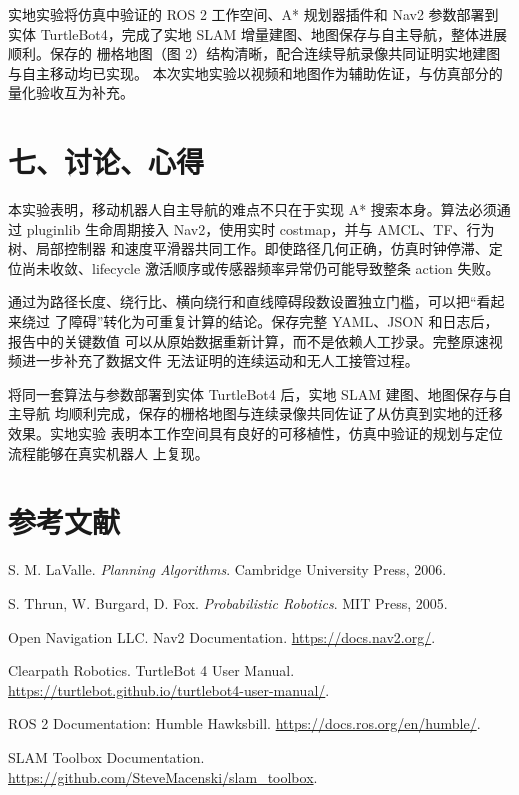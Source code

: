 \documentclass[12pt,a4paper]{ctexart}
\begin{document}
实地实验将仿真中验证的 ROS 2 工作空间、A* 规划器插件和 Nav2 参数部署到实体
TurtleBot4，完成了实地 SLAM 增量建图、地图保存与自主导航，整体进展顺利。保存的
栅格地图（图 2）结构清晰，配合连续导航录像共同证明实地建图与自主移动均已实现。
本次实地实验以视频和地图作为辅助佐证，与仿真部分的量化验收互为补充。

\section*{七、讨论、心得}

本实验表明，移动机器人自主导航的难点不只在于实现 A* 搜索本身。算法必须通过
pluginlib 生命周期接入 Nav2，使用实时 costmap，并与 AMCL、TF、行为树、局部控制器
和速度平滑器共同工作。即使路径几何正确，仿真时钟停滞、定位尚未收敛、lifecycle
激活顺序或传感器频率异常仍可能导致整条 action 失败。

通过为路径长度、绕行比、横向绕行和直线障碍段数设置独立门槛，可以把“看起来绕过
了障碍”转化为可重复计算的结论。保存完整 YAML、JSON 和日志后，报告中的关键数值
可以从原始数据重新计算，而不是依赖人工抄录。完整原速视频进一步补充了数据文件
无法证明的连续运动和无人工接管过程。

将同一套算法与参数部署到实体 TurtleBot4 后，实地 SLAM 建图、地图保存与自主导航
均顺利完成，保存的栅格地图与连续录像共同佐证了从仿真到实地的迁移效果。实地实验
表明本工作空间具有良好的可移植性，仿真中验证的规划与定位流程能够在真实机器人
上复现。

\section*{参考文献}

\begin{enumerate}[label={[\arabic*]}]
  \item S. M. LaValle. \emph{Planning Algorithms}. Cambridge University Press, 2006.
  \item S. Thrun, W. Burgard, D. Fox. \emph{Probabilistic Robotics}. MIT Press, 2005.
  \item Open Navigation LLC. Nav2 Documentation.
  \url{https://docs.nav2.org/}.
  \item Clearpath Robotics. TurtleBot 4 User Manual.
  \url{https://turtlebot.github.io/turtlebot4-user-manual/}.
  \item ROS 2 Documentation: Humble Hawksbill.
  \url{https://docs.ros.org/en/humble/}.
  \item SLAM Toolbox Documentation.
  \url{https://github.com/SteveMacenski/slam_toolbox}.
\end{enumerate}
\end{document}
